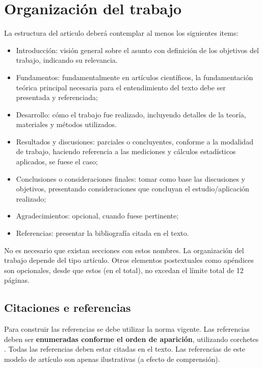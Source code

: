 \documentclass[12pt, a4paper, twoside, twocolumn]{article}
\begin{document}
\section{Organización del trabajo}

La estructura del articulo deberá contemplar al menos los siguientes items:
%
\begin{itemize}[noitemsep,topsep=0ex] \itemsep=3pt
	\item Introducción: visión general sobre el asunto con definición de los objetivos del trabajo, indicando su relevancia.
	\item Fundamentos: fundamentalmente en artículos científicos, la fundamentación teórica principal necesaria para el entendimiento del texto debe ser presentada y referenciada;
	\item Desarrollo: cómo el trabajo fue realizado, incluyendo detalles de la teoría, materiales y métodos utilizados.
	\item Resultados y discusiones: parciales o concluyentes, conforme a la modalidad de trabajo, haciendo referencia a las mediciones y cálculos estadísticos aplicados, se fuese el caso;
	\item Conclusiones o consideraciones finales: tomar como base las discusiones y objetivos, presentando consideraciones que concluyan el estudio/aplicación realizado;
	\item Agradecimientos: opcional, cuando fuese pertinente;
	\item Referencias: presentar la bibliografía citada en el texto.
\end{itemize}
%
No es necesario que existan secciones con estos nombres. La organización del trabajo depende del tipo artículo.
Otros elementos postextuales como apéndices son opcionales, desde que estos (en el total), no excedan el límite total de 12 páginas.

\subsection{Citaciones e referencias}

Para construir las referencias se debe utilizar la norma vigente. Las referencias deben ser \textbf{enumeradas conforme el orden de aparición}, utilizando corchetes \cite{Gomes-2015}. Todas las referencias deben estar citadas en el texto. Las referencias \cite{Mareze-2017,Fonseca-2013,Brandao-2017,Gomes-2015,Oppenheim-2010,Muller-2001,Mareze-2019,Borges-2018,Ristow-2016} de este modelo de artículo son apenas ilustrativas (a efecto de comprensión).
\end{document}
